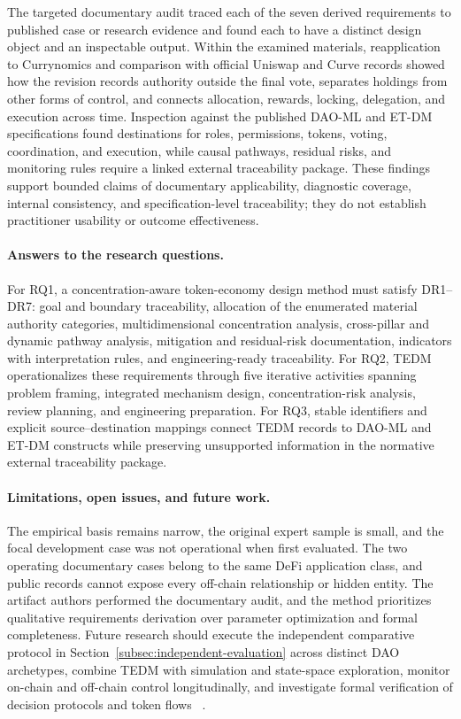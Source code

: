 \documentclass[referee,sn-basic]{sn-jnl}
\begin{document}
The targeted documentary audit traced each of the seven derived requirements to
published case or research evidence and found each to have a distinct design
object and an inspectable output. Within the examined materials, reapplication
to Currynomics and comparison with official Uniswap and Curve records showed
how the revision records authority outside
the final vote, separates holdings from other forms of control, and connects
allocation, rewards, locking, delegation, and execution across time. Inspection
against the published DAO-ML and ET-DM specifications found destinations for
roles, permissions, tokens, voting, coordination, and execution, while causal
pathways, residual risks, and monitoring rules require a linked external
traceability package. These findings support bounded claims of documentary
applicability, diagnostic coverage, internal consistency, and specification-level
traceability; they do not establish practitioner usability or outcome
effectiveness.

\paragraph{Answers to the research questions.}
For RQ1, a concentration-aware token-economy design method must satisfy DR1--DR7:
goal and boundary traceability, allocation of the enumerated material authority categories,
multidimensional concentration analysis, cross-pillar and dynamic pathway
analysis, mitigation and residual-risk documentation, indicators with
interpretation rules, and engineering-ready traceability. For RQ2, TEDM
operationalizes these requirements through five iterative activities spanning
problem framing, integrated mechanism design, concentration-risk analysis,
review planning, and engineering preparation. For RQ3, stable identifiers and
explicit source--destination mappings connect TEDM records to DAO-ML and ET-DM
constructs while preserving unsupported information in the normative external
traceability package.

\paragraph{Limitations, open issues, and future work.}
The empirical basis remains narrow, the original expert sample is small, and
the focal development case was not operational when first evaluated. The two
operating documentary cases belong to the same DeFi application class, and
public records cannot expose every off-chain relationship or hidden entity.
The artifact authors performed the documentary audit, and the method
prioritizes qualitative requirements derivation over parameter optimization and
formal completeness. Future research should execute the independent comparative
protocol in Section~\ref{subsec:independent-evaluation} across distinct DAO
archetypes, combine TEDM with simulation and state-space
exploration, monitor on-chain and off-chain control longitudinally, and
investigate formal verification of decision protocols and token flows
~\cite{Zargham2018StateSpaceBlockchain,
RiceZargham2019TokenEngineeringIII,Zargham2020}.
\end{document}
